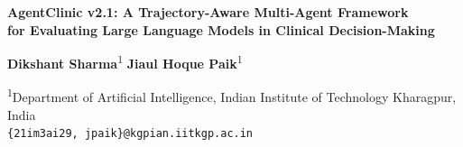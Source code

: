 \documentclass[10pt, a4paper]{article}
\begin{document}

\begin{center}
    {\LARGE\bfseries\color{MidnightBlue}
    AgentClinic v2.1: A Trajectory-Aware Multi-Agent Framework\\[4pt]
    for Evaluating Large Language Models in Clinical Decision-Making}

    \vspace{12pt}
    {\normalsize
    \textbf{Dikshant Sharma}\textsuperscript{1} \quad
    \textbf{Jiaul Hoque Paik}\textsuperscript{1}
    }

    \vspace{4pt}
    {\small
    \textsuperscript{1}Department of Artificial Intelligence,
    Indian Institute of Technology Kharagpur, India\\
    \texttt{\{21im3ai29, jpaik\}@kgpian.iitkgp.ac.in}
    }


\end{center}
\end{document}
